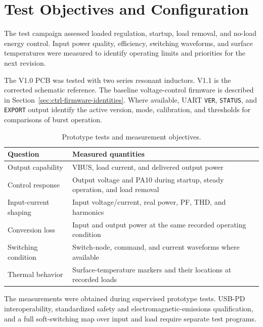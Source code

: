 \section{Test Objectives and Configuration}
\label{sec:method-objectives}

The test campaign assessed loaded regulation, startup, load removal, and
no-load energy control. Input power quality, efficiency, switching waveforms,
and surface temperatures were measured to identify operating limits and
priorities for the next revision.

The V1.0 PCB was tested with two series resonant inductors. V1.1 is the corrected
schematic reference. The baseline voltage-control firmware is described in Section~\ref{sec:ctrl-firmware-identities}. Where available,
UART \texttt{VER}, \texttt{STATUS}, and \texttt{EXPORT} output identify the
active version, mode, calibration, and thresholds for comparisons of burst
operation.

\begin{table}[htbp]
\centering
\caption{Prototype tests and measurement objectives.}
\label{tab:method-objectives}
\begin{tabularx}{\textwidth}{@{}p{}X@{}}
\toprule
Question & Measured quantities\\
\midrule
Output capability & VBUS, load current, and delivered output power\\
Control response & Output voltage and PA10 during startup, steady operation, and load removal\\
Input-current shaping & Input voltage/current, real power, PF, THD, and harmonics\\
Conversion loss & Input and output power at the same recorded operating condition\\
Switching condition & Switch-node, command, and current waveforms where available\\
Thermal behavior & Surface-temperature markers and their locations at recorded loads\\
\bottomrule
\end{tabularx}
\end{table}

The measurements were obtained during supervised prototype tests. USB-PD interoperability,
standardized safety and electromagnetic-emissions qualification, and a full
soft-switching map over input and load require separate test programs.
